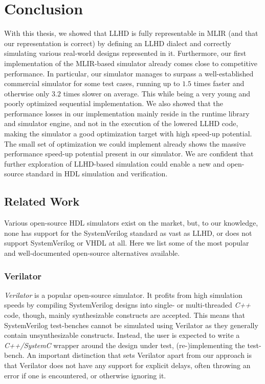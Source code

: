 
\chapter{Conclusion}
With this thesis, we showed that LLHD is fully representable in MLIR (and that our representation is correct) by defining an LLHD dialect and correctly simulating various real-world designs represented in it.
Furthermore, our first implementation of the MLIR-based simulator already comes close to competitive performance. In particular, our simulator manages to surpass a well-established commercial simulator for some test cases, running up to $1.5$ times faster and otherwise only $3.2$ times slower on average. This while being a very young and poorly optimized sequential implementation.
We also showed that the performance losses in our implementation mainly reside in the runtime library and simulator engine, and not in the execution of the lowered LLHD code, making the simulator a good optimization target with high speed-up potential. The small set of optimization we could implement already shows the massive performance speed-up potential present in our simulator. We are confident that further exploration of LLHD-based simulation could enable a new and open-source standard in HDL simulation and verification.


\section{Related Work}
Various open-source HDL simulators exist on the market, but, to our knowledge, none has support for the SystemVerilog standard as vast as LLHD, or does not support SystemVerilog or VHDL at all. Here we list some of the most popular and well-documented open-source alternatives available.


\subsection{Verilator}
\textit{Verilator} \cite{verilator} is a popular open-source simulator. It profits from high simulation speeds by compiling SystemVerilog designs into single- or multi-threaded \textit{C++} code, though, mainly synthesizable constructs are accepted. This means that SystemVerilog test-benches cannot be simulated using Verilator as they generally contain unsynthesizable constructs. Instead, the user is expected to write a \textit{C++/SystemC} wrapper around the design under test, (re-)implementing the test-bench. An important distinction that sets Verilator apart from our approach is that Verilator does not have any support for explicit delays, often throwing an error if one is encountered, or otherwise ignoring it.

